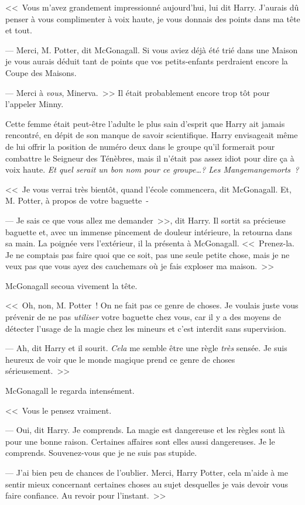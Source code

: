 <<~Vous m'avez grandement impressionné aujourd'hui, lui dit Harry. J'aurais dû penser à vous complimenter à voix haute, je vous donnais des points dans ma tête et tout.

--- Merci, M. Potter, dit McGonagall. Si vous aviez déjà été trié dans une Maison je vous aurais déduit tant de points que vos petits-enfants perdraient encore la Coupe des Maisons.

--- Merci à \emph{vous}, Minerva.~>> Il était probablement encore trop tôt pour l'appeler Minny.

Cette femme était peut-être l'adulte le plus sain d'esprit que Harry ait jamais rencontré, en dépit de son manque de savoir scientifique. Harry envisageait même de lui offrir la position de numéro deux dans le groupe qu'il formerait pour combattre le Seigneur des Ténèbres, mais il n'était pas assez idiot pour dire ça à voix haute. \emph{Et quel serait un bon nom pour ce groupe…? Les Mangemangemorts~?}

<<~Je vous verrai très bientôt, quand l'école commencera, dit McGonagall. Et, M. Potter, à propos de votre baguette~-

--- Je sais ce que vous allez me demander~>>, dit Harry. Il sortit sa précieuse baguette et, avec un immense pincement de douleur intérieure, la retourna dans sa main. La poignée vers l'extérieur, il la présenta à McGonagall. <<~Prenez-la. Je ne comptais pas faire quoi que ce soit, pas une seule petite chose, mais je ne veux pas que vous ayez des cauchemars où je fais exploser ma maison.~>>

McGonagall secoua vivement la tête.

<<~Oh, non, M. Potter~! On ne fait pas ce genre de choses. Je voulais juste vous prévenir de ne pas \emph{utiliser} votre baguette chez vous, car il y a des moyens de détecter l'usage de la magie chez les mineurs et c'est interdit sans supervision.

--- Ah, dit Harry et il sourit. \emph{Cela} me semble être une règle \emph{très} sensée. Je suis heureux de voir que le monde magique prend ce genre de choses sérieusement.~>>

McGonagall le regarda intensément.

<<~Vous le pensez vraiment.

--- Oui, dit Harry. Je comprends. La magie est dangereuse et les règles sont là pour une bonne raison. Certaines affaires sont elles aussi dangereuses. Je le comprends. Souvenez-vous que je ne suis pas stupide.

--- J'ai bien peu de chances de l'oublier. Merci, Harry Potter, cela m'aide à me sentir mieux concernant certaines choses au sujet desquelles je vais devoir vous faire confiance. Au revoir pour l'instant.~>>

